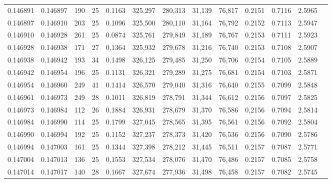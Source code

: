 \begin{tabular}{rrrrrrrrrrrrr}
0.146891 & 0.146897 & 190 &  25 &                                     0.1163 & 325,297 & 280,313 &  31,139 &  76,817 & 0.2151 & 0.7116 & 2.5965 \\
0.146897 & 0.146910 & 203 &  25 &                                     0.1096 & 325,500 & 280,110 &  31,164 &  76,792 & 0.2152 & 0.7113 & 2.5947 \\
0.146910 & 0.146928 & 261 &  25 &                                     0.0874 & 325,761 & 279,849 &  31,189 &  76,767 & 0.2153 & 0.7111 & 2.5923 \\
0.146928 & 0.146938 & 171 &  27 &                                     0.1364 & 325,932 & 279,678 &  31,216 &  76,740 & 0.2153 & 0.7108 & 2.5907 \\
0.146938 & 0.146942 & 193 &  34 &                                     0.1498 & 326,125 & 279,485 &  31,250 &  76,706 & 0.2154 & 0.7105 & 2.5889 \\
0.146942 & 0.146954 & 196 &  25 &                                     0.1131 & 326,321 & 279,289 &  31,275 &  76,681 & 0.2154 & 0.7103 & 2.5871 \\
0.146954 & 0.146960 & 249 &  41 &                                     0.1414 & 326,570 & 279,040 &  31,316 &  76,640 & 0.2155 & 0.7099 & 2.5848 \\
0.146961 & 0.146973 & 249 &  28 &                                     0.1011 & 326,819 & 278,791 &  31,344 &  76,612 & 0.2156 & 0.7097 & 2.5825 \\
0.146973 & 0.146984 & 112 &  26 &                                     0.1884 & 326,931 & 278,679 &  31,370 &  76,586 & 0.2156 & 0.7094 & 2.5814 \\
0.146984 & 0.146990 & 114 &  25 &                                     0.1799 & 327,045 & 278,565 &  31,395 &  76,561 & 0.2156 & 0.7092 & 2.5804 \\
0.146990 & 0.146994 & 192 &  25 &                                     0.1152 & 327,237 & 278,373 &  31,420 &  76,536 & 0.2156 & 0.7090 & 2.5786 \\
0.146994 & 0.147003 & 161 &  25 &                                     0.1344 & 327,398 & 278,212 &  31,445 &  76,511 & 0.2157 & 0.7087 & 2.5771 \\
0.147004 & 0.147013 & 136 &  25 &                                     0.1553 & 327,534 & 278,076 &  31,470 &  76,486 & 0.2157 & 0.7085 & 2.5758 \\
0.147014 & 0.147017 & 140 &  28 &                                     0.1667 & 327,674 & 277,936 &  31,498 &  76,458 & 0.2157 & 0.7082 & 2.5745 \\

\end{tabular}
